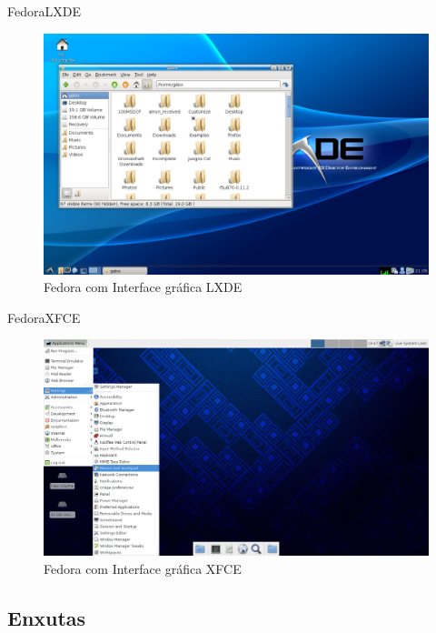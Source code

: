 \documentclass{beamer}
\begin{document}
\begin{frame}{Fedora}{LXDE}
 \begin{figure}[h!]
        \centering
        \includegraphics[scale=0.3]{FedoraLXDE.jpg}
        \caption{Fedora com Interface gráfica LXDE}
        \label{fig:Comando ls}
    \end{figure}
\end{frame}

\begin{frame}{Fedora}{XFCE}
 \begin{figure}[h!]
        \centering
        \includegraphics[scale=0.22]{FedoraXFCE.jpg}
        \caption{Fedora com Interface gráfica XFCE}
        \label{fig:Comando ls}
    \end{figure}
\end{frame}

\subsection{Enxutas}
\end{document}
